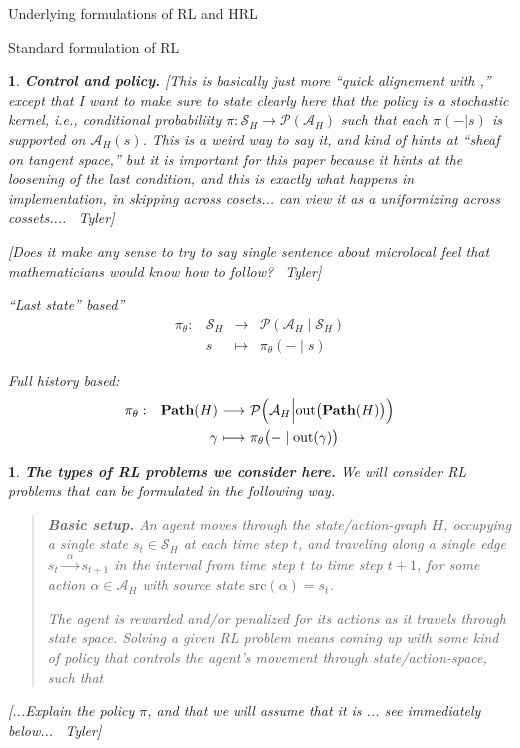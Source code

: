 \documentclass[11pt]{article}
\newtheorem{ermark}[subsubsection]{}
\begin{document}
\begin{section}{Underlying formulations of RL and HRL}
\begin{subsection}{Standard formulation of RL}
\begin{ermark}
{\bf Control and policy.}
\normalfont
{\color{blue} [This is basically just more ``quick alignement with \cite{SBRL},'' except that I want to make sure to state clearly here that the policy is a stochastic kernel, i.e., conditional probabiliity $\pi:\mathcal{S}_{H}\longrightarrow\mathcal{P}(\mathcal{A}_{H})$ such that each $\pi(-|s)$ is supported on $\mathcal{A}_{H}(s)$. This is a weird way to say it, and kind of hints at ``sheaf on tangent space,'' but it is important for this paper because it hints at the loosening of the last condition, and this is exactly what happens in implementation, in skipping across cosets... can view it as a uniformizing across cossets.... \textemdash\ Tyler]}

{\color{blue} [Does it make any sense to try to say single sentence about microlocal feel that mathematicians would know how to follow? \textemdash\ Tyler]}

``Last state'' based''
$$
\begin{array}{rrcl}
\pi_{\theta}:
&\mathcal{S}_{H}
&
\!\!\!\!\longrightarrow\!\!\!\!
&\mathcal{P}(\mathcal{A}_{H}\mid\mathcal{S}_{H}) \\[5pt]
&
s
&
\!\!\!\!\longmapsto\!\!\!\!
& \pi_{\theta}(-\mid s)
\end{array}
$$


Full history based:
$$
\begin{array}{rrcl}
\pi_{\theta}:
&\bold{Path}(H)
&
\!\!\!\!\longrightarrow\!\!\!\!
&\mathcal{P}\Big(\mathcal{A}_{H}\Big|\text{out}\big(\bold{Path}(H)\big)\Big) \\[7pt]
&
\gamma
&
\!\!\!\!\longmapsto\!\!\!\!
& \pi_{\theta}\big(-\mid \text{out}(\gamma)\big)
\end{array}
$$
\end{ermark}

\begin{ermark}
{\bf The types of RL problems we consider here.}
\normalfont
We will consider RL problems that can be formulated in the following way.

\begin{quote}
{\bf Basic setup.}
An agent moves through the state/action-graph $H$, occupying a single state $s_{t}\in\mathcal{S}_{H}$ at each time step $t$, and traveling along a single edge 
$
s_{t}\xrightarrow{\ \ \alpha\ \ }s_{t+1}
$
in the interval from time step $t$ to time step $t+1$, for some action $\alpha\in\mathcal{A}_{H}$ with source state $\text{src}(\alpha)=s_{t}$.

The agent is rewarded and/or penalized for its actions as it travels through state space. {\em Solving} a given RL problem means coming up with some kind of policy that controls the agent's movement through state/action-space, such that 
\end{quote}
{\color{blue} [...Explain the policy $\pi$, and that we will assume that it is ... see immediately below... \textemdash\ Tyler]}
\end{ermark}
 

\end{subsection}
\end{section}
\end{document}
